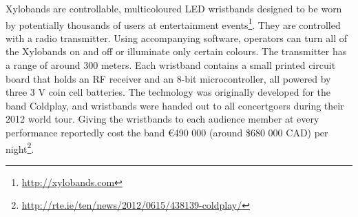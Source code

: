 Xylobands are controllable, multicoloured LED wristbands designed to be worn by potentially thousands of users at entertainment events\footnote{\url{http://xylobands.com}}. They are controlled with a radio transmitter. Using accompanying software, operators can turn all of the Xylobands on and off or illuminate only certain colours. The transmitter has a range of around 300 meters. Each wristband contains a small printed circuit board that holds an RF receiver and an 8-bit microcontroller, all powered by three 3 V coin cell batteries. The technology was originally developed for the band Coldplay, and wristbands were handed out to all concertgoers during their 2012 world tour. Giving the wristbands to each audience member at every performance reportedly cost the band \euro{}490 000 (around \$680 000 CAD) per night\footnote{\url{http://rte.ie/ten/news/2012/0615/438139-coldplay/}}.